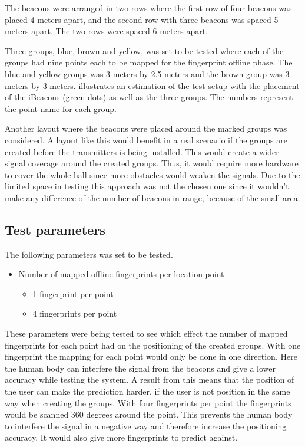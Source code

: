 \bigskip

The beacons were arranged in two rows where the first row of four beacons was placed 4 meters apart, and the second row with three beacons was spaced 5 meters apart.
The two rows were spaced 6 meters apart.

\bigskip


Three groups, blue, brown and yellow, was set to be tested where each of the groups had nine points each to be mapped for the fingerprint offline phase.
The blue and yellow groups was 3 meters by 2.5 meters and the brown group was 3 meters by 3 meters.
 illustrates an estimation of the test setup with the placement of the iBeacons (green dots) as well as the three groups.
The numbers represent the point name for each group.


Another layout where the beacons were placed around the marked groups was considered.
A layout like this would benefit in a real scenario if the groups are created before the transmitters is being installed.
This would create a wider signal coverage around the created groups.
Thus, it would require more hardware to cover the whole hall since more obstacles would weaken the signals.
Due to the limited space in testing this approach was not the chosen one since it wouldn't make any difference of the number of beacons in range, because of the small area.

\newpage

\subsection{Test parameters}\label{sec:methodTestParameters}
The following parameters was set to be tested.

\begin{itemize}
\item Number of mapped offline fingerprints per location point
	\begin{itemize}
		\item 1 fingerprint per point
		\item 4 fingerprints per point
	\end{itemize}
\end{itemize}

These parameters were being tested to see which effect the number of mapped fingerprints for each point had on the positioning of the created groups.
With one fingerprint the mapping for each point would only be done in one direction.
Here the human body can interfere the signal from the beacons and give a lower accuracy while testing the system.
A result from this means that the position of the user can make the prediction harder, if the user is not position in the same way when creating the groups.
With four fingerprints per point the fingerprints would be scanned 360 degrees around the point. 
This prevents the human body to interfere the signal in a negative way and therefore increase the positioning accuracy.
It would also give more fingerprints to predict against.

\bigskip

